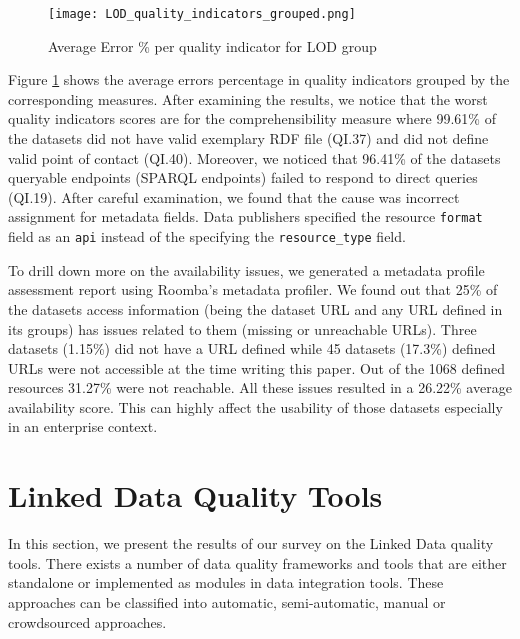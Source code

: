 \begin{figure}[ht]
  \centering
    \texttt{[image: LOD\_quality\_indicators\_grouped.png]}
  \caption{Average Error \% per quality indicator for LOD group}
  \label{fig:average-error-lod-group}
\end{figure}

Figure \ref{fig:average-error-lod-group} shows the average errors percentage in quality indicators grouped by the corresponding measures. After examining the results, we notice that the worst quality indicators scores are for the comprehensibility measure where 99.61\% of the datasets did not have valid exemplary RDF file (QI.37) and did not define valid point of contact (QI.40). Moreover, we noticed that 96.41\% of the datasets queryable endpoints (SPARQL endpoints) failed to respond to direct queries (QI.19). After careful examination, we found that the cause was incorrect assignment for metadata fields. Data publishers specified the resource \texttt{format} field as an \texttt{api} instead of the specifying the \texttt{resource\_type} field.

To drill down more on the availability issues, we generated a metadata profile assessment report using Roomba's metadata profiler. We found out that 25\% of the datasets access information (being the dataset URL and any URL defined in its groups) has issues related to them (missing or unreachable URLs).
Three datasets (1.15\%) did not have a URL defined while 45 datasets (17.3\%) defined URLs were not accessible at the time writing this paper. Out of the 1068 defined resources 31.27\% were not reachable. All these issues resulted in a 26.22\% average availability score. This can highly affect the usability of those datasets especially in an enterprise context.


\section{Linked Data Quality Tools}
\label{section:quality-tools}
In this section, we present the results of our survey on the Linked Data quality tools. There exists a number of data quality frameworks and tools that are either standalone or implemented as modules in data integration tools. These approaches can be classified into automatic, semi-automatic, manual or crowdsourced approaches.


